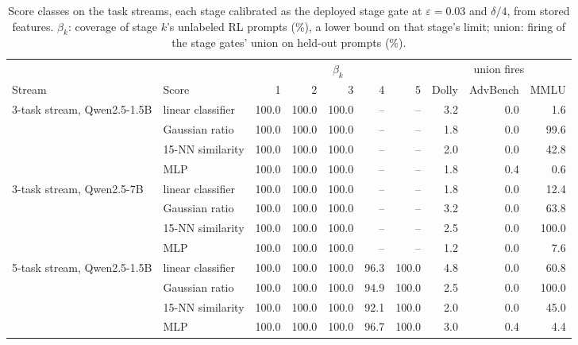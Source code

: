 \begin{table}[t]
\centering
\scriptsize
\setlength{\tabcolsep}{2.4pt}
\caption{Score classes on the task streams, each stage calibrated as the deployed stage gate at $\varepsilon=0.03$ and $\delta/4$, from stored features. $\beta_k$: coverage of stage $k$'s unlabeled RL prompts (\%), a lower bound on that stage's limit; union: firing of the stage gates' union on held-out prompts (\%).}
\label{tab:scorestream}
\begin{tabular}{l l rrrrr rrr}
\toprule
 & & \multicolumn{5}{c}{$\beta_k$} & \multicolumn{3}{c}{union fires} \\
Stream & Score & 1 & 2 & 3 & 4 & 5 & Dolly & AdvBench & MMLU \\
\midrule
3-task stream, Qwen2.5-1.5B & linear classifier & 100.0 & 100.0 & 100.0 & -- & -- & 3.2 & 0.0 & 1.6 \\
 & Gaussian ratio & 100.0 & 100.0 & 100.0 & -- & -- & 1.8 & 0.0 & 99.6 \\
 & 15-NN similarity & 100.0 & 100.0 & 100.0 & -- & -- & 2.0 & 0.0 & 42.8 \\
 & MLP & 100.0 & 100.0 & 100.0 & -- & -- & 1.8 & 0.4 & 0.6 \\
3-task stream, Qwen2.5-7B & linear classifier & 100.0 & 100.0 & 100.0 & -- & -- & 1.8 & 0.0 & 12.4 \\
 & Gaussian ratio & 100.0 & 100.0 & 100.0 & -- & -- & 3.2 & 0.0 & 63.8 \\
 & 15-NN similarity & 100.0 & 100.0 & 100.0 & -- & -- & 2.5 & 0.0 & 100.0 \\
 & MLP & 100.0 & 100.0 & 100.0 & -- & -- & 1.2 & 0.0 & 7.6 \\
5-task stream, Qwen2.5-1.5B & linear classifier & 100.0 & 100.0 & 100.0 & 96.3 & 100.0 & 4.8 & 0.0 & 60.8 \\
 & Gaussian ratio & 100.0 & 100.0 & 100.0 & 94.9 & 100.0 & 2.5 & 0.0 & 100.0 \\
 & 15-NN similarity & 100.0 & 100.0 & 100.0 & 92.1 & 100.0 & 2.0 & 0.0 & 45.0 \\
 & MLP & 100.0 & 100.0 & 100.0 & 96.7 & 100.0 & 3.0 & 0.4 & 4.4 \\
\bottomrule
\end{tabular}
\end{table}
